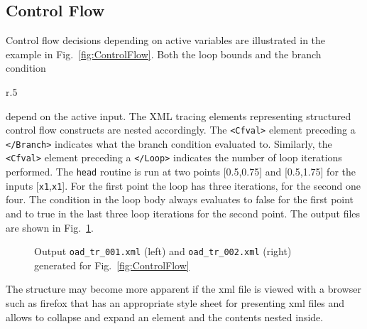 \documentclass{article}
\newcommand{\reffig}[1]{{Fig.~\ref{#1}}}
\begin{document}
\subsection{Control Flow}
Control flow decisions depending on active variables are illustrated in the example in 
\reffig{fig:ControlFlow}.
Both the loop bounds and the branch condition 
\begin{wrapfigure}{r}{.5\textwidth}
\begin{minipage}{.96\linewidth}

\end{minipage}
\caption{An example for control flow decisions depending in active variables}\label{fig:ControlFlow} 
\end{wrapfigure} 
depend on the active input.  
The XML tracing elements representing structured control flow constructs are nested accordingly. 
The \lstinline{<Cfval>} element preceding a \lstinline{</Branch>} indicates what the branch 
condition evaluated to. Similarly, the \lstinline{<Cfval>} element preceding a \lstinline{</Loop>} 
indicates the number of loop iterations performed.       
The \lstinline{head} routine 
is run at two  points [0.5,0.75] and [0.5,1.75] for the inputs [\lstinline{x1},\lstinline{x1}].
For the first point the loop has three iterations, for the second one four. The condition in the loop body always evaluates to false for the first point and to true in the last three loop iterations for the second point. The output files are shown in \reffig{fig:ControlFlowOutput}. 
\begin{figure}
\begin{minipage}[t]{.48\textwidth}

\end{minipage}
\begin{minipage}[t]{.48\textwidth}

\end{minipage}
\caption{Output \lstinline{oad_tr_001.xml} (left) 
and \lstinline{oad_tr_002.xml} (right) 
generated for \reffig{fig:ControlFlow}}\label{fig:ControlFlowOutput}
\end{figure}
The structure may become more apparent if the xml file is viewed  
with a browser such as firefox that has an appropriate style sheet for presenting xml files 
and allows to collapse and expand an element and the contents nested inside. 
\end{document}
